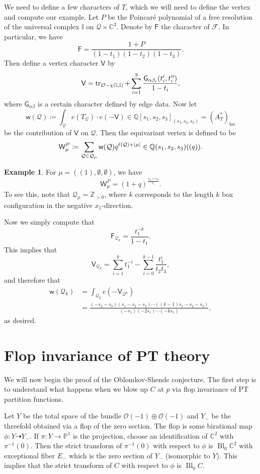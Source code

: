 \documentclass[leqno, openany]{memoir}
\theoremstyle{definition}
\newtheorem{exm}[thm]{Example}
\theoremstyle{remark}
\theoremstyle{plain}
\theoremstyle{definition}
\theoremstyle{remark}
\newcommand{\C}{\mathbb{C}}
\newcommand{\Z}{\mathbb{Z}}
\newcommand{\Q}{\mathbb{Q}}
\renewcommand{\P}{\mathbb{P}}
\newcommand{\mc}[1]{\mathcal{#1}}
\newcommand{\mr}[1]{\mathrm{#1}}
\newcommand{\ms}[1]{\mathsf{#1}}
\newcommand{\1}{\mathbf{1}}
\newcommand{\2}{\mathbf{2}}
\newcommand{\3}{\mathbf{3}}
\DeclareMathOperator{\Bl}{Bl}
\begin{document}
We need to define a few characters of $T$, which we will need to define the vertex and compute our example. Let $P$ be the Poincar\'e polynomial of a free resolution of the universal complex $\mathbb{I}$ on $\mc{Q} \times \C^3$. Denote by $\ms{F}$ the character of $\mc{F}$. In particular, we have
\[ \ms{F} = \frac{1 + P}{(1-t_1)(1-t_2)(1-t_3)}. \]
Then define a vertex character $\ms{V}$ by
\[ \ms{V} = \tr_{\mc{O} - \chi(\mathbb{I}, \mathbb{I})} + \sum_{i=1}^3 \frac{\ms{G}_{\alpha \beta_i} (t_i', t_i'')}{1-t_i}, \]
where $\ms{G}_{\alpha\beta}$ is a certain character defined by edge data.
Now let 
\[ \ms{w}(\mc{Q}) \coloneqq \int_{\mc{Q}} e(T_{\mc{Q}}) \cdot e(-\ms{V}) \in \Q[s_1, s_2, s_3]_{(s_1, s_2, s_3)} = {(A_T^*)}_{\mr{loc}} \]
be the contribution of $\ms{V}$ on $\mc{Q}$. Then the equivariant vertex is defined to be
\[ \ms{W}_{\mu}^P \coloneqq \sum_{\mc{Q} \in \mc{Q}_{\mu}} \ms{w}(\mc{{Q}}) q^{\ell(\mc{Q}) + \abs{\mu}} \in \Q(s_1, s_2, s_3)((q)). \]

\begin{exm}
    For $\mu = ((1), \emptyset, \emptyset)$, we have
    \[ \ms{W}_{\mu}^P = {(1+q)}^{\frac{s_2 + s_3}{s_1}}. \]
    To see this, note that $\mc{Q}_{\mu} = \Z_{>0}$, where $k$ corresponds to the length $k$ box configuration in the negative $x_1$-direction.

    Now we simply compute that
    \[ \ms{F}_{\mc{Q}_k} = \frac{t_1^{-k}}{1-t_1}. \]
    This implies that 
    \[ \ms{V}_{\mc{Q}_k} = \sum_{i=1}^k t_1^{-i} - \sum_{i=0}^{k-1} \frac{t_1^i}{t_2 t_3}, \]
    and therefore that
    \begin{align*}
        \ms{w}(\mc{Q}_k) &= \int_{\mc{Q}_k} e(-\ms{V}_{\mc{Q}^k}) \\
        &= \frac{(-s_2 - s_3)(s_1 - s_2 - s_3) \cdots ((k-1)s_1 - s_2 - s_3)}{(-s_1)(-2s_1) \cdots (-k s_1)},
    \end{align*}
    as desired.
\end{exm}

\section{Flop invariance of PT theory}%
\label{sec:flop_invariance_of_pt_theory}

We will now begin the proof of the Oblomkov-Shende conjecture. The first step is to understand what happens when we blow up $C$ at $p$ via flop invariance of PT partition functions.

Let $Y$ be the total space of the bundle $\mc{O}(-1) \oplus \mc{O}(-1)$ and $Y_-$ be the threefold obtained via a flop of the zero section. The flop is some birational map $\phi \colon Y \dashrightarrow Y_-$. If $\pi \colon Y \to \P^1$ is the projection, choose an identification of $\C^2$ with $\pi^{-1}(0)$. Then the strict transform of $\pi^{-1}(0)$ with respect to $\phi$ is $\Bl_{0} \C^2$ with exceptional fiber $E_-$ which is the zero section of $Y_-$ (isomorphic to $Y$). This implies that the strict transform of $C$ with respect to $\phi$ is $\Bl_0 C$.
\end{document}
